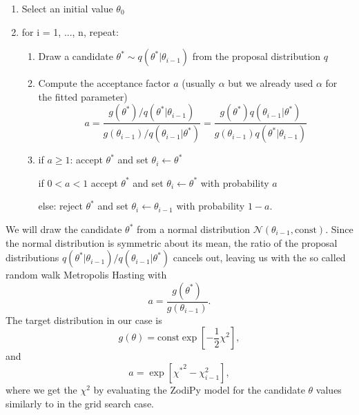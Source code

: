 \documentclass{article}
\begin{document}
\begin{enumerate}
    \item Select an initial value $\theta_0$
    \item for i = 1, ..., n, repeat:
    \begin{enumerate}
        \item Draw a candidate $\theta^* \sim q(\theta^* | \theta_{i-1})$ from the proposal distribution $q$
        \item Compute the acceptance factor $a$ (usually $\alpha$ but we already used $\alpha$ for the fitted parameter)
        \begin{equation}
            a = \frac{g(\theta^*)/q(\theta^* | \theta_{i-1})}{g(\theta_{i-1})/q(\theta_{i-1} | \theta^*)} = \frac{g(\theta^*) q(\theta_{i-1} | \theta^*)}{g(\theta_{i-1}) q(\theta^* | \theta_{i-1})}
        \end{equation}
        
        \item if $a \geq 1$: accept $\theta^*$ and set $\theta_i \leftarrow \theta^*$

        if $0 < a < 1 $ accept $\theta^*$ and set $\theta_i \leftarrow \theta^*$ with probability $a$

        else: reject $\theta^*$ and set $\theta_i \leftarrow \theta_{i-1}$ with probability $1 - a$.
    \end{enumerate}
\end{enumerate}
We will draw the candidate $\theta^*$ from a normal distribution $\mathcal{N}(\theta_{i-1}, \mathrm{const})$. Since the normal distribution is symmetric about its mean, the ratio of the proposal distributions $q(\theta^* | \theta_{i-1})/q(\theta_{i-1} | \theta^*)$ cancels out, leaving us with the so called random walk Metropolis Hasting with 
\begin{equation}
    a = \frac{g(\theta^*)}{g(\theta_{i-1})}.
\end{equation}
The target distribution in our case is 
\begin{equation}
    g(\theta) = \mathrm{const} \exp\left[-\frac{1}{2}\chi^2\right],
\end{equation}
and 
\begin{equation}
    a = \exp \left[ {\chi^*}^2 - \chi^2_{i-1}\right],
\end{equation}
where we get the $\chi^2$ by evaluating the ZodiPy model for the candidate $\theta$ values similarly to in the grid search case. 
\end{document}
